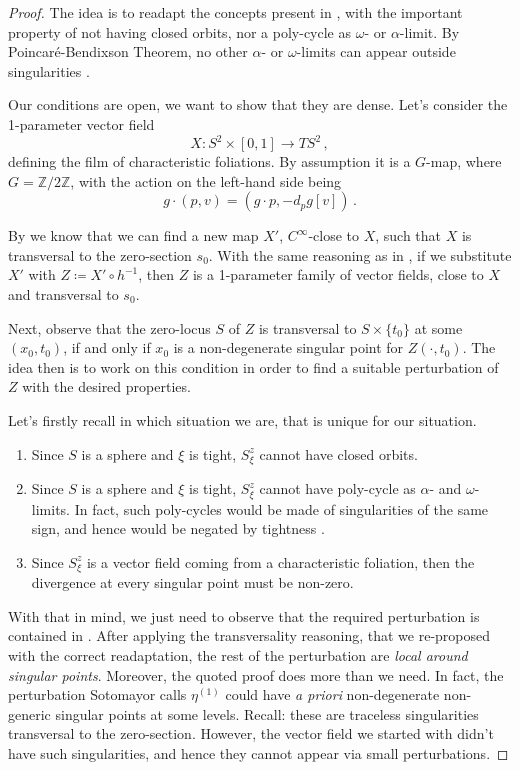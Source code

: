 \documentclass[a4paper, 11pt]{amsart}
\theoremstyle{plain}
\theoremstyle{definition}
\newcommand{\Z}{\mathbb{Z}}
\begin{document}
\begin{proof}
	The idea is to readapt the concepts present in \cite[Prop.\ II.2.1]{sotomayorgenericoneparameter}, with the important property of not having closed orbits, nor a poly-cycle as $\omega$- or $\alpha$-limit. By Poincaré-Bendixson Theorem, no other $\alpha$- or $\omega$-limits can appear outside singularities \cite[Thm.\ 4.7.8]{geigesIntroductionContactTopology2008}.
	
	Our conditions are open, we want to show that they are dense. Let's consider the 1-parameter vector field 
	\[
		X \colon S^2 \times [0,1] \to TS^2\,,
	\]
	defining the film of characteristic foliations. By assumption it is a $G$-map, where $G = \Z/2\Z$, with the action on the left-hand side being
	\[
		g\cdot(p,v) = (g\cdot p, - d_pg[v])\,.
	\]
	
	By  we know that we can find a new map $X'$, $C^\infty$-close to $X$, such that $X$ is transversal to the zero-section $s_0$. With the same reasoning as in , if we substitute $X'$ with $Z \coloneqq X' \circ h^{-1}$, then $Z$ is a 1-parameter family of vector fields, close to $X$ and transversal to $s_0$.
	
	Next, observe that the zero-locus $S$ of $Z$ is transversal to $S \times \{t_0\}$ at some $(x_0, t_0)$, if and only if $x_0$ is a non-degenerate singular point for $Z(\cdot,t_0)$. The idea then is to work on this condition in order to find a suitable perturbation of $Z$ with the desired properties. 
	
	Let's firstly recall in which situation we are, that is unique for our situation.
	\begin{enumerate}
		\item Since $S$ is a sphere and $\xi$ is tight, $S^z_\xi$ cannot have closed orbits.
		\item Since $S$ is a sphere and $\xi$ is tight, $S^z_\xi$ cannot have poly-cycle as $\alpha$- and $\omega$-limits. In fact, such poly-cycles would be made of singularities of the same sign, and hence would be negated by tightness \cite[Prop.\ 6.4.33]{geigesIntroductionContactTopology2008}.
		\item Since $S^z_\xi$ is a vector field coming from a characteristic foliation, then the divergence at every singular point must be non-zero.
	\end{enumerate}
	
	With that in mind, we just need to observe that the required perturbation is contained in \cite[Prop.\ II.2.1]{sotomayorgenericoneparameter}. After applying the transversality reasoning, that we re-proposed with the correct readaptation, the rest of the perturbation are \emph{local around singular points}. Moreover, the quoted proof does more than we need. In fact, the perturbation Sotomayor calls $\eta^{(1)}$ could have \emph{a priori} non-degenerate non-generic singular points at some levels. Recall: these are traceless singularities transversal to the zero-section. However, the vector field we started with didn't have such singularities, and hence they cannot appear via small perturbations.
	

\end{proof}
\end{document}
